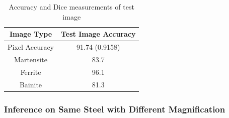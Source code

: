 \documentclass[]{article}
\begin{document}
\begin{table}[h!]
	\centering
	\begin{tabular}{|c|c|}
		\hline
		\textbf{Image Type} & \textbf{Test Image Accuracy}\\
		\hline
		Pixel Accuracy & 91.74 (0.9158) \\
		\hline
		Martensite & 83.7 \\
		Ferrite & 96.1 \\
		Bainite & 81.3 \\
		\hline
	\end{tabular}
	\caption{Accuracy and Dice measurements of test image}
\end{table}

\subsubsection{Inference on Same Steel with Different Magnification}
\end{document}

